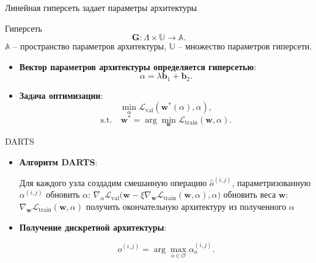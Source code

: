 \documentclass{beamer}
\begin{document}
\begin{frame}{Линейная гиперсеть задает параметры архитектуры}

\begin{block}{Гиперсеть}
$$\mathbf{G} : \Lambda \times \mathbb{U} \rightarrow \mathbb{A}.$$
$\mathbb{A}$ -- пространство параметров архитектуры, $\mathbb{U}$ -- множество параметров гиперсети.
\end{block}

\begin{itemize}
\item \textbf{Вектор параметров архитектуры определяется гиперсетью}:
$$\alpha = \lambda\mathbf{b}_1 + \mathbf{b}_2.$$

\item \textbf{Задача оптимизации}:
$$\min_{\alpha}\mathcal{L}_\text{val}(\mathbf{w}^*(\alpha), \alpha),$$ $$
 \mathrm{s.t.}\quad \mathbf{w}^* = \arg\min_{\mathbf{w}}\mathcal{L}_\text{train}(\mathbf{w}, \alpha).$$
\end{itemize}



\end{frame}
\begin{frame}{DARTS}
\begin{itemize}
\item \textbf{Алгоритм  DARTS}:
 \begin{algorithm}[H]
\begin{algorithmic}[1]
\caption{DARTS -- Differentiable Architecture Search}
\STATE Для каждого узла создадим смешанную операцию $\hat{o}^{(i, j)}$, параметризованную $\alpha^{(i, j)}$
\STATE  обновить $\alpha$: $\nabla_\alpha \mathcal{L}_\text{val}\bigl(\mathbf{w} - \xi\nabla_{\mathbf{w}}\mathcal{L}_\text{train}(\mathbf{w}, \alpha), \alpha\bigr)$
\STATE обновить веса $\mathbf{w}$: $\nabla_\mathbf{w}\mathcal{L}_\text{train}(\mathbf{w}, \alpha)$
\ENDWHILE
\STATE получить окончательную архитектуру из полученного $\alpha$
\end{algorithmic}
\end{algorithm}
\item \textbf{Получение дискретной архитектуры}:

$$o^{(i, j)} =\arg\max_{o\in\mathcal{O}}\alpha_o^{(i, j)}.$$

\end{itemize}

\end{frame}
\end{document}
